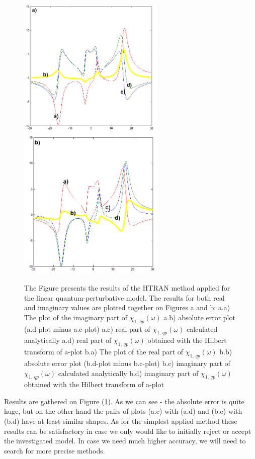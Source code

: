 \documentclass[12pt,twoside,a4paper]{article}
\numberwithin{equation}{subsection}
\numberwithin{figure}{subsection}
\begin{document}
\begin{figure} 
  \includegraphics[width=70mm]{img/htran_qp_2da.png} 
  \includegraphics[width=70mm]{img/htran_qp_2db.png}  
  \caption{The Figure presents the results of the HTRAN method applied for the linear quantum-perturbative model. The results for both real
  and imaginary values are plotted together on Figures a and b:
  a.a) The plot of the imaginary part of ${\chi_{1, \, qp}}(\omega )$ 
  a.b) absolute error plot (a.d-plot minus a.c-plot) 
  a.c) real part of ${\chi_{1, \, qp}}(\omega )$ calculated analytically
  a.d) real part of ${\chi_{1, \, qp}}(\omega )$ obtained with the Hilbert transform of a-plot
  b.a) The plot of the real part of ${\chi_{1, \, qp}}(\omega )$
  b.b) absolute error plot (b.d-plot minus b.c-plot)  
  b.c) imaginary part of ${\chi_{1, \, qp}}(\omega )$ calculated analytically 
  b.d) imaginary part of ${\chi_{1, \, qp}}(\omega )$ obtained with the Hilbert transform of a-plot 
  \label{fig:htran_qp_2d}}
\end{figure}

Results are gathered on Figure (\ref{fig:htran_qp_2d}). As we can see - the absolute error is quite huge, but on the other hand the
pairs of plots (a.c) with (a.d) and (b.c) with (b.d) have at least similar shapes. As for the simplest applied method these results can be
satisfactory in case we only would like to initially reject or accept the investigated model. In case we need much higher accuracy, we will
need to search for more precise methods.
\end{document}
